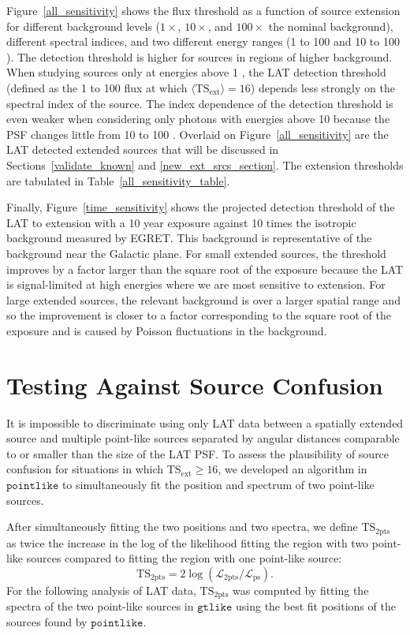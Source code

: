 \documentclass[12pt,preprint]{aastex}
\newcommand{\gev}{\text{GeV}\xspace}
\newcommand{\tsext}{{\ensuremath{\text{TS}_{\text{ext}}}}\xspace}
\newcommand{\tsinc}{\ensuremath{\text{TS}_{\text{2pts}}}\xspace}
\newcommand{\likelihood}{\ensuremath{\mathcal{L}}\xspace}
\newcommand{\gtlike}{\ensuremath{\mathtt{gtlike}}\xspace}
\newcommand{\pointlike}{\ensuremath{\mathtt{pointlike}}\xspace}
\begin{document}
Figure~\ref{all_sensitivity} shows the flux threshold as a function of
source extension for different background levels ($1\times$, $10\times$,
and $100\times$ the nominal background), different spectral indices,
and two different energy ranges (1 \gev to 100 \gev and 10 \gev to
100 \gev).  The detection threshold is higher for sources in regions of
higher background.  When studying sources only at energies above 1 \gev,
the LAT detection threshold (defined as the 1 \gev to 100 \gev flux at
which $\langle\tsext\rangle=16$) depends less strongly on the 
spectral index of the source. 
The index dependence of the detection threshold is
even weaker when considering only photons with energies above 10 \gev
because the PSF changes little from 10 \gev to 100 \gev.
Overlaid on Figure~\ref{all_sensitivity} are the LAT detected extended
sources that will be discussed in Sections~\ref{validate_known} and
\ref{new_ext_srcs_section}.  The extension thresholds are tabulated in
Table~\ref{all_sensitivity_table}.

Finally, Figure~\ref{time_sensitivity} shows the projected
detection threshold of the LAT to extension with a 10 year
exposure against 10 times
the isotropic background measured by EGRET. This background is
representative of the background near the Galactic plane.  For small
extended sources, the threshold improves by a factor larger
than the square root of the exposure because the LAT is signal-limited
at high energies where we are most sensitive to extension. For large
extended sources, the relevant background is over a larger spatial range
and so the improvement is closer to a factor corresponding
to the square root of the exposure and is caused by Poisson fluctuations in the background.


\section{Testing Against Source Confusion}
\label{dual_localization_method}

It is impossible to discriminate using only LAT data between a
spatially extended source and multiple point-like sources separated by
angular distances comparable to or smaller than the size of the LAT PSF.
To assess the plausibility of source confusion for situations
in which $\tsext\ge16$, we developed an algorithm in \pointlike to
simultaneously fit the position and spectrum of two point-like sources.

After simultaneously fitting the two positions and two spectra,
we define \tsinc as twice the increase in the log of the likelihood
fitting the region with two point-like sources compared to fitting the
region with one point-like source:
\begin{equation}
  \tsinc=2\log(\likelihood_\text{2pts}/\likelihood_\text{ps}).
\end{equation} 
For the following analysis of LAT data, \tsinc was computed
by fitting the spectra of the two point-like sources in \gtlike using the best fit positions
of the sources found by \pointlike.
\end{document}
